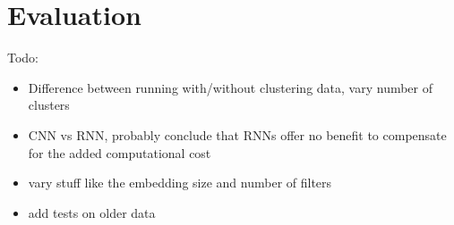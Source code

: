 \chapter{Evaluation}
Todo:
\begin{itemize}
  \item Difference between running with/without clustering data, vary number of clusters
  \item CNN vs RNN, probably conclude that RNNs offer no benefit to compensate
    for the added computational cost
  \item vary stuff like the embedding size and number of filters
  \item add tests on older data
\end{itemize}

